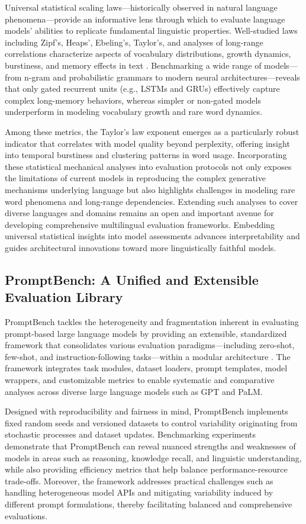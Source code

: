Universal statistical scaling laws---historically observed in natural language phenomena---provide an informative lens through which to evaluate language models' abilities to replicate fundamental linguistic properties. Well-studied laws including Zipf’s, Heaps’, Ebeling’s, Taylor’s, and analyses of long-range correlations characterize aspects of vocabulary distributions, growth dynamics, burstiness, and memory effects in text \cite{ref51}. Benchmarking a wide range of models---from n-gram and probabilistic grammars to modern neural architectures---reveals that only gated recurrent units (e.g., LSTMs and GRUs) effectively capture complex long-memory behaviors, whereas simpler or non-gated models underperform in modeling vocabulary growth and rare word dynamics.

Among these metrics, the Taylor’s law exponent emerges as a particularly robust indicator that correlates with model quality beyond perplexity, offering insight into temporal burstiness and clustering patterns in word usage. Incorporating these statistical mechanical analyses into evaluation protocols not only exposes the limitations of current models in reproducing the complex generative mechanisms underlying language but also highlights challenges in modeling rare word phenomena and long-range dependencies. Extending such analyses to cover diverse languages and domains remains an open and important avenue for developing comprehensive multilingual evaluation frameworks. Embedding universal statistical insights into model assessments advances interpretability and guides architectural innovations toward more linguistically faithful models.

\subsection{PromptBench: A Unified and Extensible Evaluation Library}

PromptBench tackles the heterogeneity and fragmentation inherent in evaluating prompt-based large language models by providing an extensible, standardized framework that consolidates various evaluation paradigms---including zero-shot, few-shot, and instruction-following tasks---within a modular architecture \cite{ref6}. The framework integrates task modules, dataset loaders, prompt templates, model wrappers, and customizable metrics to enable systematic and comparative analyses across diverse large language models such as GPT and PaLM.

Designed with reproducibility and fairness in mind, PromptBench implements fixed random seeds and versioned datasets to control variability originating from stochastic processes and dataset updates. Benchmarking experiments demonstrate that PromptBench can reveal nuanced strengths and weaknesses of models in areas such as reasoning, knowledge recall, and linguistic understanding, while also providing efficiency metrics that help balance performance-resource trade-offs. Moreover, the framework addresses practical challenges such as handling heterogeneous model APIs and mitigating variability induced by different prompt formulations, thereby facilitating balanced and comprehensive evaluations.

